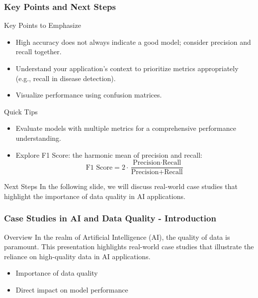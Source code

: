 \documentclass[aspectratio=169]{beamer}
\begin{document}
\begin{frame}[fragile]
    \frametitle{Key Points and Next Steps}
    \begin{block}{Key Points to Emphasize}
        \begin{itemize}
            \item High accuracy does not always indicate a good model; consider precision and recall together.
            \item Understand your application's context to prioritize metrics appropriately (e.g., recall in disease detection).
            \item Visualize performance using confusion matrices.
        \end{itemize}
    \end{block}
    
    \begin{block}{Quick Tips}
        \begin{itemize}
            \item Evaluate models with multiple metrics for a comprehensive performance understanding.
            \item Explore F1 Score: the harmonic mean of precision and recall:
            \begin{equation}
            \text{F1 Score} = 2 \cdot \frac{\text{Precision} \cdot \text{Recall}}{\text{Precision} + \text{Recall}}
            \end{equation}
        \end{itemize}
    \end{block}

    \begin{block}{Next Steps}
        In the following slide, we will discuss real-world case studies that highlight the importance of data quality in AI applications.
    \end{block}
\end{frame}

\begin{frame}[fragile]
    \frametitle{Case Studies in AI and Data Quality - Introduction}
    \begin{block}{Overview}
        In the realm of Artificial Intelligence (AI), the quality of data is paramount. This presentation highlights real-world case studies that illustrate the reliance on high-quality data in AI applications.
    \end{block}
    \begin{itemize}
        \item Importance of data quality
        \item Direct impact on model performance
    \end{itemize}
\end{frame}
\end{document}
